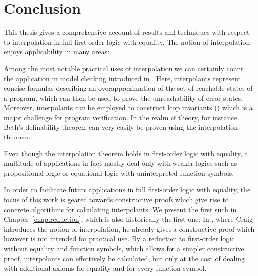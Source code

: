 \chapter{Conclusion}

This thesis gives a comprehensive account of results and techniques with respect to interpolation in full first-order logic with equality.
The notion of interpolation enjoys applicability in many areas:

Among the most notable practical uses of interpolation we can certainly count the application in model checking introduced in \cite{McMillan03}.
Here, interpolants represent concise formulas describing an overapproximation of the set of reachable states of a program, which can then be used to prove the unreachability of error states.
Moreover, interpolants can be employed to construct loop invariants (\cite{weissenbacher2010}) which is a major challenge for program verification.
In the realm of theory, for instance Beth's definability theorem can very easily be proven using the interpolation theorem.

Even though the interpolation theorem holds in first-order logic with equality, %
a multitude of applications in fact mostly deal only with weaker logics such as propositional logic or equational logic with uninterpreted function symbols.

In order to facilitate future applications in full first-order logic with equality, the focus of this work is geared towards constructive proofs which give rise to concrete algorithms for calculating interpolants.
We present the first such in Chapter~\ref{chap:reduction}, which is also historically the first one:
In \cite{Craig57linear,Craig57three}, where Craig introduces the notion of interpolation, he already gives a constructive proof 
which however is not intended for practical use.
By a reduction to first-order logic without equality and function symbols, which allows for a simpler constructive proof, interpolants can effectively be calculated, but only at the cost of dealing with additional axioms for equality and for every function symbol.

